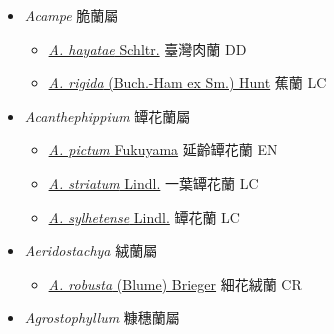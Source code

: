 
  \begin{itemize}
 \item[] \textit{Acampe} 脆蘭屬
                    
  \begin{itemize}
        \item[] \href{http://www.theplantlist.org/tpl1.1/search?q=Acampe+hayatae}{\textit{A. hayatae} Schltr.}   臺灣肉蘭 DD
        \item[] \href{http://www.theplantlist.org/tpl1.1/search?q=Acampe+rigida}{\textit{A. rigida} (Buch.-Ham ex Sm.) Hunt}   蕉蘭 LC
  \end{itemize}
 \item[] \textit{Acanthephippium} 罈花蘭屬
                    
  \begin{itemize}
        \item[] \href{http://www.theplantlist.org/tpl1.1/search?q=Acanthephippium+pictum}{\textit{A. pictum} Fukuyama}   延齡罈花蘭 EN
        \item[] \href{http://www.theplantlist.org/tpl1.1/search?q=Acanthephippium+striatum}{\textit{A. striatum} Lindl.}   一葉罈花蘭 LC
        \item[] \href{http://www.theplantlist.org/tpl1.1/search?q=Acanthephippium+sylhetense}{\textit{A. sylhetense} Lindl.}   罈花蘭 LC
  \end{itemize}
 \item[] \textit{Aeridostachya} 絨蘭屬
                    
  \begin{itemize}
        \item[] \href{http://www.theplantlist.org/tpl1.1/search?q=Aeridostachya+robusta}{\textit{A. robusta} (Blume) Brieger}     細花絨蘭 CR
  \end{itemize}
 \item[] \textit{Agrostophyllum} 糠穗蘭屬
                    

\end{itemize}

